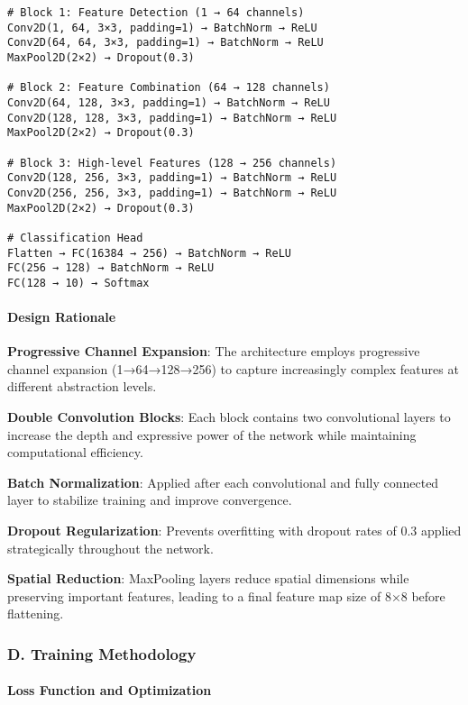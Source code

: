 \documentclass[11pt,a4paper,twoside]{article}
\begin{document}
\begin{verbatim}
# Block 1: Feature Detection (1 → 64 channels)
Conv2D(1, 64, 3×3, padding=1) → BatchNorm → ReLU
Conv2D(64, 64, 3×3, padding=1) → BatchNorm → ReLU
MaxPool2D(2×2) → Dropout(0.3)

# Block 2: Feature Combination (64 → 128 channels)
Conv2D(64, 128, 3×3, padding=1) → BatchNorm → ReLU
Conv2D(128, 128, 3×3, padding=1) → BatchNorm → ReLU
MaxPool2D(2×2) → Dropout(0.3)

# Block 3: High-level Features (128 → 256 channels)
Conv2D(128, 256, 3×3, padding=1) → BatchNorm → ReLU
Conv2D(256, 256, 3×3, padding=1) → BatchNorm → ReLU
MaxPool2D(2×2) → Dropout(0.3)

# Classification Head
Flatten → FC(16384 → 256) → BatchNorm → ReLU
FC(256 → 128) → BatchNorm → ReLU
FC(128 → 10) → Softmax
\end{verbatim}

\paragraph{Design Rationale}

\textbf{Progressive Channel Expansion}: The architecture employs
progressive channel expansion (1→64→128→256) to capture increasingly
complex features at different abstraction levels.

\textbf{Double Convolution Blocks}: Each block contains two
convolutional layers to increase the depth and expressive power of the
network while maintaining computational efficiency.

\textbf{Batch Normalization}: Applied after each convolutional and fully
connected layer to stabilize training and improve convergence.

\textbf{Dropout Regularization}: Prevents overfitting with dropout rates
of 0.3 applied strategically throughout the network.

\textbf{Spatial Reduction}: MaxPooling layers reduce spatial dimensions
while preserving important features, leading to a final feature map size
of 8×8 before flattening.

\subsubsection{D. Training Methodology}\label{d.-training-methodology}

\paragraph{Loss Function and
Optimization}\label{loss-function-and-optimization}
\end{document}
